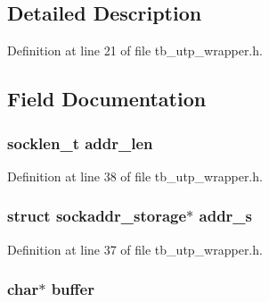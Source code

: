 \subsection{Detailed Description}


Definition at line 21 of file tb\-\_\-utp\-\_\-wrapper.\-h.



\subsection{Field Documentation}
\hypertarget{structtb__utp__wrapper__t_a116941d922ae354d7241d04b0f3c84d8}{
\subsubsection[{addr\-\_\-len}]{\setlength{\rightskip}{0pt plus 5cm}socklen\-\_\-t addr\-\_\-len}}\label{structtb__utp__wrapper__t_a116941d922ae354d7241d04b0f3c84d8}


Definition at line 38 of file tb\-\_\-utp\-\_\-wrapper.\-h.

\hypertarget{structtb__utp__wrapper__t_a6c6b934648a67540d62892076f229e35}{
\subsubsection[{addr\-\_\-s}]{\setlength{\rightskip}{0pt plus 5cm}struct sockaddr\-\_\-storage$\ast$ addr\-\_\-s}}\label{structtb__utp__wrapper__t_a6c6b934648a67540d62892076f229e35}


Definition at line 37 of file tb\-\_\-utp\-\_\-wrapper.\-h.

\hypertarget{structtb__utp__wrapper__t_aff2566f4c366b48d73479bef43ee4d2e}{
\subsubsection[{buffer}]{\setlength{\rightskip}{0pt plus 5cm}char$\ast$ buffer}}\label{structtb__utp__wrapper__t_aff2566f4c366b48d73479bef43ee4d2e}


